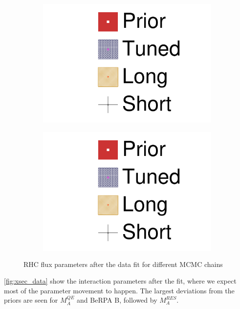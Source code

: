 \begin{figure}[h]
\begin{subfigure}[t]{0.24\textwidth}
		\includegraphics[width=\textwidth, trim={0mm 0mm 0mm 0mm}, clip,page=16]{figures/mach3/data/2017b_NewData_NewDet_UpdXsecStep_2Xsec_4Det_5Flux_0_2017b_June_NewDet_merge_2017b_NewDet_June_Long_0}
	\end{subfigure}
	\begin{subfigure}[t]{0.24\textwidth}
		\includegraphics[width=\textwidth, trim={0mm 0mm 0mm 0mm}, clip,page=17]{figures/mach3/data/2017b_NewData_NewDet_UpdXsecStep_2Xsec_4Det_5Flux_0_2017b_June_NewDet_merge_2017b_NewDet_June_Long_0}
	\end{subfigure}
	\caption{RHC flux parameters after the data fit for different MCMC chains}
	\label{fig:flux_data_rhc}
\end{figure}

\autoref{fig:xsec_data} show the interaction parameters after the fit, where we expect most of the parameter movement to happen. The largest deviations from the priors are seen for $M_A^{QE}$ and BeRPA B, followed by $M_A^{RES}$. 

